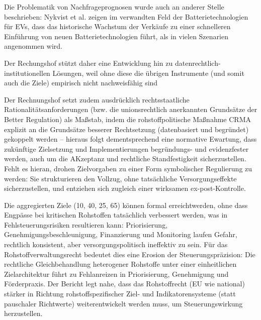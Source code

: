 \documentclass[12pt,a4paper,oneside]{book} %
\begin{document}
Die Problematik von Nachfrageprognosen wurde auch an anderer Stelle beschrieben: Nykvist et al. zeigen im verwandten Feld der Batterietechnologien für EVs, dass das historische Wachstum der Verkäufe zu einer schnelleren Einführung von neuen Batterietechnologien führt, als in vielen Szenarien angenommen wird.\autocite{Expanding battery production enables fast	technology response to mineral criticality} 
	
Der Rechungshof stützt daher eine Entwicklung hin zu datenrechtlich-institutionellen Lösungen, weil ohne diese die übrigen Instrumente (und somit auch die Ziele) empirisch nicht nachweisfähig sind

Der Rechnungshof setzt zudem ausdrücklich rechtsstaatliche Rationalitätsanforderungen (bzw. die unionsrechtlich anerkannten Grundsätze der \glqq Better Regulation\grqq) als Maßstab, indem die rohstoffpolitische Maßnahme CRMA explizit an die Grundsätze besserer Rechtsetzung (datenbasiert und begründet) gekoppelt werden -- hieraus folgt dementsprechend eine normative Ewartung, dass zukünftige Zielsetzung und Implementierungen begründungs- und evidenzfester werden, auch um die AKzeptanz und rechtliche Standfestigkeit sicherzustellen. Fehlt es hieran, drohen Zielvorgaben zu einer Form symbolischer Regulierung zu werden: Sie strukturieren den Vollzug, ohne tatsächliche Versorgungseffekte sicherzustellen, und entziehen sich zugleich einer wirksamen ex-post-Kontrolle.

Die aggregierten Ziele (10, 40, 25, 65) können \glqq formal erreicht\grqq  werden, ohne dass Engpässe bei kritischen Rohstoffen tatsächlich verbessert werden, was in Fehlsteuerungsrisiken resultieren kann: Priorisierung, Genehmigungsbeschleunigung, Finanzierung und Monitoring laufen Gefahr, rechtlich konsistent, aber versorgungspolitisch ineffektiv zu sein. Für das Rohstoffverwaltungsrecht bedeutet dies eine Erosion der Steuerungspräzision: Die rechtliche Gleichbehandlung heterogener Rohstoffe unter einer einheitlichen Zielarchitektur führt zu Fehlanreizen in Priorisierung, Genehmigung und Förderpraxis. Der Bericht legt nahe, dass das Rohstoffrecht (EU wie national) stärker in Richtung rohstoffspezifischer Ziel- und Indikatorensysteme (statt pauschaler Richtwerte) weiterentwickelt werden muss, um Steuerungswirkung herzustellen.
\end{document}
